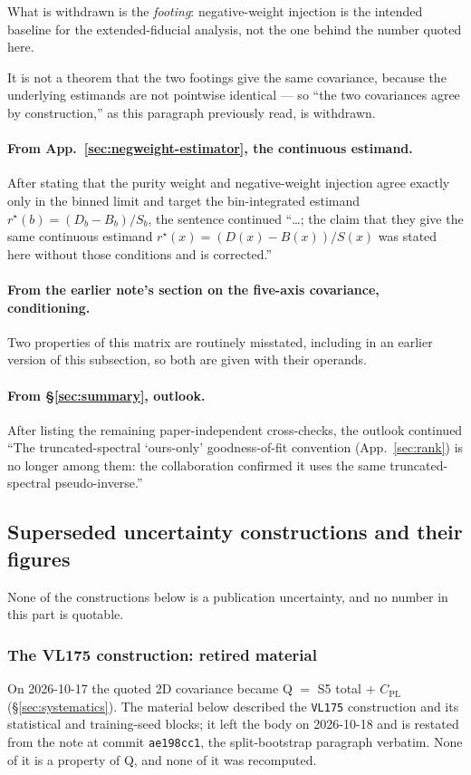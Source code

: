 What is withdrawn is the \emph{footing}: negative-weight injection is the intended baseline for the extended-fiducial analysis, not the one behind the number quoted here.

It is not a theorem that the two footings give the same covariance, because the underlying estimands are not pointwise identical --- so ``the two covariances agree by construction,'' as this paragraph previously read, is withdrawn.

\paragraph{From App.~\ref{sec:negweight-estimator}, the continuous estimand.} After stating that the purity weight and negative-weight injection agree exactly only in the binned limit and target the bin-integrated estimand $r^{\star}(b)=(D_{b}-B_{b})/S_{b}$, the sentence continued ``\ldots; the claim that they give the same continuous estimand $r^{\star}(x)=(D(x)-B(x))/S(x)$ was stated here without those conditions and is corrected.''

\paragraph{From the earlier note's section on the five-axis covariance, conditioning.} Two properties of this matrix are routinely misstated, including in an earlier version of this subsection, so both are given with their operands.

\paragraph{From \S\ref{sec:summary}, outlook.} After listing the remaining paper-independent cross-checks, the outlook continued ``The truncated-spectral `ours-only' goodness-of-fit convention (App.~\ref{sec:rank}) is no longer among them: the collaboration confirmed it uses the same truncated-spectral pseudo-inverse.''

\subsection{Superseded uncertainty constructions and their figures}
\label{app:history-superseded}

None of the constructions below is a publication uncertainty, and no number in this part is quotable.

\subsubsection{The VL175 construction: retired material}
\label{app:history-vl175}
On 2026-10-17 the quoted 2D covariance became Q $=$ S5 total $+$ $C_{\mathrm{PL}}$ (\S\ref{sec:systematics}). The material below described the \texttt{VL175} construction and its statistical and training-seed blocks; it left the body on 2026-10-18 and is restated from the note at commit \texttt{ae198cc1}, the split-bootstrap paragraph verbatim. None of it is a property of Q, and none of it was recomputed.

